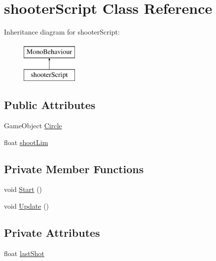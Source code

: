 \hypertarget{classshooter_script}{\section{shooter\-Script Class Reference}
\label{classshooter_script}
}
Inheritance diagram for shooter\-Script\-:\begin{figure}[H]
\begin{center}
\leavevmode
\includegraphics[height=2.000000cm]{classshooter_script}
\end{center}
\end{figure}
\subsection*{Public Attributes}
\begin{DoxyCompactItemize}
\item 
Game\-Object \hyperlink{classshooter_script_aec5b91ec83c6e5326f9f251f46411367}{Circle}
\item 
float \hyperlink{classshooter_script_a35395b1d291048e31353f9300c4e61be}{shoot\-Lim}
\end{DoxyCompactItemize}
\subsection*{Private Member Functions}
\begin{DoxyCompactItemize}
\item 
void \hyperlink{classshooter_script_a5537eb84985ee1bd03183f66b4f87237}{Start} ()
\item 
void \hyperlink{classshooter_script_a4076123ad3efc3184b433ec934cce1bd}{Update} ()
\end{DoxyCompactItemize}
\subsection*{Private Attributes}
\begin{DoxyCompactItemize}
\item 
float \hyperlink{classshooter_script_a3b49886ffefc2a63ad5cb5995da709b4}{last\-Shot}
\end{DoxyCompactItemize}


